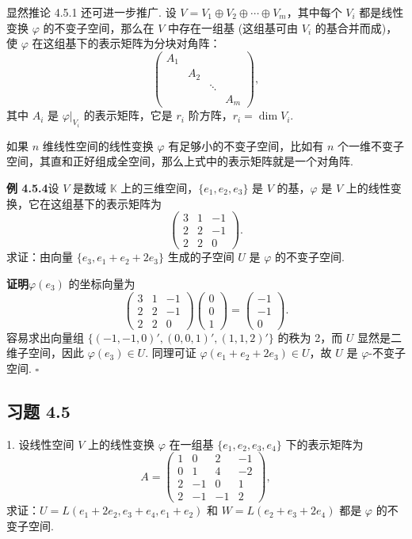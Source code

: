\documentclass[UTF8, 12pt, fontset=fandol, oneside]{ctexart}
\begin{document}
显然推论 4.5.1 还可进一步推广. 设 $V=V_1\oplus V_2\oplus\cdots\oplus V_m$，其中每个 $V_i$ 都是线性变换 $\varphi$ 的不变子空间，那么在 $V$ 中存在一组基 (这组基可由 $V_i$ 的基合并而成)，使 $\varphi$ 在这组基下的表示矩阵为分块对角阵：
\[
\left(\begin{array}{cccc}
A_1 & & &\\
& A_2 & &\\
& & \ddots &\\
& & & A_m
\end{array}\right),
\]
其中 $A_i$ 是 $\varphi|_{V_i}$ 的表示矩阵，它是 $r_i$ 阶方阵，$r_i=\dim V_i$.

如果 $n$ 维线性空间的线性变换 $\varphi$ 有足够小的不变子空间，比如有 $n$ 个一维不变子空间，其直和正好组成全空间，那么上式中的表示矩阵就是一个对角阵.

\noindent\textbf{例 4.5.4}\quad 设 $V$ 是数域 $\mathbb{K}$ 上的三维空间，$\{e_1,e_2,e_3\}$ 是 $V$ 的基，$\varphi$ 是 $V$ 上的线性变换，它在这组基下的表示矩阵为
\[
\left(\begin{array}{rrr}
3 & 1 & -1\\
2 & 2 & -1\\
2 & 2 & 0
\end{array}\right).
\]
求证：由向量 $\{e_3,e_1+e_2+2e_3\}$ 生成的子空间 $U$ 是 $\varphi$ 的不变子空间.

\noindent\textbf{证明}\quad $\varphi(e_3)$ 的坐标向量为
\[
\left(\begin{array}{rrr}
3 & 1 & -1\\
2 & 2 & -1\\
2 & 2 & 0
\end{array}\right)
\left(\begin{array}{c}
0\\
0\\
1
\end{array}\right)
=
\left(\begin{array}{r}
-1\\
-1\\
0
\end{array}\right).
\]
容易求出向量组 $\{(-1,-1,0)',(0,0,1)',(1,1,2)'\}$ 的秩为 2，而 $U$ 显然是二维子空间，因此 $\varphi(e_3)\in U$. 同理可证 $\varphi(e_1+e_2+2e_3)\in U$，故 $U$ 是 $\varphi$-不变子空间. $\square$

\subsection*{习题 4.5}

1. 设线性空间 $V$ 上的线性变换 $\varphi$ 在一组基 $\{e_1,e_2,e_3,e_4\}$ 下的表示矩阵为
\[
A=
\left(\begin{array}{rrrr}
1 & 0 & 2 & -1\\
0 & 1 & 4 & -2\\
2 & -1 & 0 & 1\\
2 & -1 & -1 & 2
\end{array}\right),
\]
求证：$U=L(e_1+2e_2,e_3+e_4,e_1+e_2)$ 和 $W=L(e_2+e_3+2e_4)$ 都是 $\varphi$ 的不变子空间.
\end{document}
